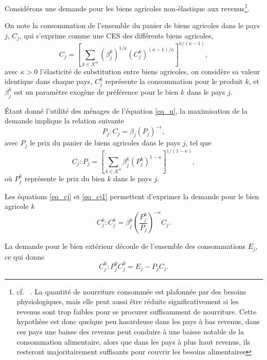 Considérons une demande pour les biens agricoles non-élastique aux revenus\footnote{cf. ~\cite{Comin2021}.  La quantité de nourriture consommée est plafonnée par des besoins physiologiques, mais elle peut aussi être réduite significativement si les revenus sont trop faibles pour se procurer suffisamment de nourriture. Cette hypothèse est donc quelque peu hasardeuse dans les pays à bas revenus, dans ces pays une baisse des revenus peut conduire à une baisse notable de la consommation alimentaire, alors que dans les pays à plus haut revenus, ils resteront majoritairement suffisants pour couvrir les besoins alimentaires}.

On note la consommation de l’ensemble du panier de biens agricoles dans le pays $j$, $C_j$, qui s’exprime comme une CES des différents biens agricoles,
\begin{equation}\label{eq_cj1}
    C_j = \left[ \sum_{k \in \mathcal{K}^a} (\beta_{j}^k)^{1/\kappa} (C_{j}^k)^{(\kappa-1)/\kappa} \right]^{\kappa/(\kappa-1)},
\end{equation}
avec $\kappa > 0$ l’élasticité de substitution entre biens agricoles, on considère sa valeur identique dans chaque pays, $C_j^k$ représente la consommation pour le produit $k$, et $\beta_{j}^k$ est un paramètre exogène de préférence pour le bien $k$ dans le pays $j$.

Étant donné l’utilité des ménages de l’équation \ref{eq_u}, la maximisation de la demande implique la relation suivante
\begin{equation}\label{eq_pj}
    P_j: C_j = \beta_j (P_j)^{-\epsilon},
\end{equation}
avec $P_j$ le prix du panier de biens agricoles dans le pays $j$, tel que
\begin{equation}\label{eq_cj}
    C_j: P_j = \left[ \sum_{k \in \mathcal{K}^a} \beta_{j}^k (P_{j}^k)^{1-\kappa} \right]^{1/(1-\kappa)},
\end{equation}
où $P_j^k$ représente le prix du bien $k$ dans le pays $j$.

Les équations \ref{eq_cj} et \ref{eq_cj1} permettent d’exprimer la demande pour le bien agricole $k$
\begin{equation}
    C_j^k: C_j^k = \beta_j^k \left(\frac{P_j^k}{P_j} \right)^{-\kappa} C_j.
\end{equation}

La demande pour le bien extérieur découle de l’ensemble des consommations $E_j$, ce qui donne
\begin{equation}
    C_j^0 : P_j^0 C_j^0 = E_j - P_j C_j.
\end{equation}


